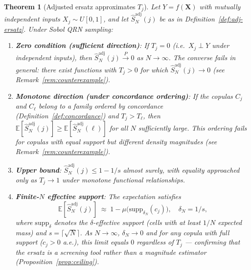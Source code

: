 \documentclass[11pt,a4paper]{article}
\newtheorem{theorem}{Theorem}
\theoremstyle{definition}
\newcommand{\E}{\mathbb{E}}
\newcommand{\bX}{\mathbf{X}}
\begin{document}
\begin{tcolorbox}[colback=gray!6, colframe=gray!40, title=Main Theorem]
\begin{theorem}[Adjusted ersatz approximates $T_j$]
\label{thm:main}
Let $Y = f(\bX)$ with mutually independent inputs $X_j \sim U[0,1]$,
and let $\hat{S}^{\mathrm{adj}}_N(j)$ be as in Definition~\ref{def:adj-ersatz}.
Under Sobol QRN sampling:

\begin{enumerate}[label=(\roman*)]
\item \textbf{Zero condition (sufficient direction)}: If $T_j = 0$
      (i.e.\ $X_j \perp Y$ under independent inputs), then
      $\hat{S}^{\mathrm{adj}}_N(j) \xrightarrow{P} 0$ as $N \to \infty$.
      The converse fails in general: there exist functions with $T_j > 0$
      for which $\hat{S}^{\mathrm{adj}}_N(j) \to 0$ (see Remark~\ref{rem:counterexample}).

\item \textbf{Monotone direction (under concordance ordering)}: If
      the copulas $C_j$ and $C_\ell$ belong to a family ordered by
      concordance (Definition~\ref{def:concordance}) and $T_j > T_\ell$,
      then $\E[\hat{S}^{\mathrm{adj}}_N(j)] \ge \E[\hat{S}^{\mathrm{adj}}_N(\ell)]$
      for all $N$ sufficiently large.  This ordering fails for copulas with
      equal support but different density magnitudes
      (see Remark~\ref{rem:counterexample}).

\item \textbf{Upper bound}: $\hat{S}^{\mathrm{adj}}_N(j) \le 1 - 1/s$ almost
      surely, with equality approached only as $T_j \to 1$ under monotone
      functional relationships.

\item \textbf{Finite-$N$ effective support}: The expectation satisfies
      \[
        \E[\hat{S}^{\mathrm{adj}}_N(j)]
        \;\approx\; 1 - \mu\!\bigl(\mathrm{supp}_{\delta_N}(c_j)\bigr),
        \quad \delta_N = 1/s,
      \]
      where $\mathrm{supp}_\delta$ denotes the $\delta$-effective support
      (cells with at least $1/N$ expected mass) and $s = \lceil\sqrt{N}\rceil$.
      As $N \to \infty$, $\delta_N \to 0$ and for any copula with
      \emph{full support} ($c_j > 0$ a.e.), this limit equals $0$
      regardless of $T_j$ — confirming that the ersatz is a screening
      tool rather than a magnitude estimator (Proposition~\ref{prop:ceiling}).
\end{enumerate}
\end{theorem}
\end{tcolorbox}
\end{document}
